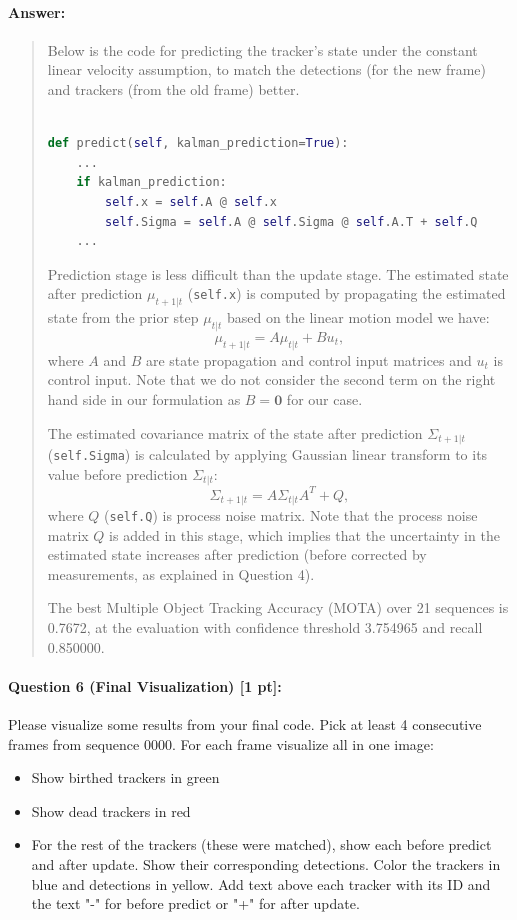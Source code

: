 \documentclass[11pt]{article}
\begin{document}
\paragraph{Answer:} 
\begin{quote}

Below is the code for predicting the tracker's state under the constant linear velocity assumption, to match the detections (for the new frame) and trackers (from the old frame) better.

\begin{lstlisting}[language=Python, basicstyle=\scriptsize]

def predict(self, kalman_prediction=True):
    ...
    if kalman_prediction:
        self.x = self.A @ self.x
        self.Sigma = self.A @ self.Sigma @ self.A.T + self.Q
    ...

\end{lstlisting}        

Prediction stage is less difficult than the update stage. The estimated state after prediction $ \mu_{t+1 | t} $ (\texttt{self.x}) is computed by propagating the estimated state from the prior step $ \mu_{t | t} $ based on the linear motion model we have:
\[ \mu_{t+1 | t} = A \mu_{t | t} + B u_t, \]
where $ A $ and $ B $ are state propagation and control input matrices and $ u_t $ is control input.
Note that we do not consider the second term on the right hand side in our formulation as $ B = \mathbf{0} $ for our case.

The estimated covariance matrix of the state after prediction $ \Sigma_{t+1 | t} $ (\texttt{self.Sigma}) is calculated by applying Gaussian linear transform to its value before prediction $ \Sigma_{t | t} $: 
\[ \Sigma_{t+1 | t} = A \Sigma_{t | t} A^T + Q, \]
where $ Q $ (\texttt{self.Q}) is process noise matrix. Note that the process noise matrix $ Q $ is added in this stage, which implies that the uncertainty in the estimated state increases after prediction (before corrected by measurements, as explained in Question 4).

The best Multiple Object Tracking Accuracy (MOTA) over 21 sequences is 0.7672, at the evaluation with confidence threshold 3.754965 and recall 0.850000. 

\end{quote}


\paragraph{Question 6 (Final Visualization) [1 pt]:}
Please visualize some results from your final code. 
Pick at least 4 consecutive frames from sequence 0000. For each frame visualize all in one image:
\begin{itemize}
    \item Show birthed trackers in green
    \item Show dead trackers in red
    \item For the rest of the trackers (these were matched), show each before predict and after update. Show their corresponding detections. Color the trackers in blue and detections in yellow. Add text above each tracker with its ID and the text "-" for before predict or "+" for after update.  
\end{itemize}
\end{document}
